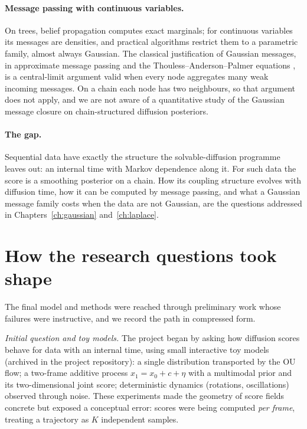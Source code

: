 \paragraph{Message passing with continuous variables.} On trees, belief
propagation computes exact marginals; for continuous variables its
messages are densities, and practical algorithms restrict them to a
parametric family, almost always Gaussian. The classical justification of
Gaussian messages, in approximate message passing and the
Thouless--Anderson--Palmer equations \citep{thouless1977solution,
donoho2009message, zdeborova2016statistical, genovese2026amp}, is a
central-limit argument valid when every node aggregates many weak
incoming messages. On a chain each node has two neighbours, so that
argument does not apply, and we are not aware of a quantitative study of
the Gaussian message closure on chain-structured diffusion posteriors.

\paragraph{The gap.} Sequential data have exactly the structure the
solvable-diffusion programme leaves out: an internal time with Markov
dependence along it. For such data the score is a smoothing posterior on a
chain. How its coupling structure evolves with diffusion time, how it can
be computed by message passing, and what a Gaussian message family costs
when the data are not Gaussian, are the questions addressed in
Chapters~\ref{ch:gaussian} and~\ref{ch:laplace}.

\section{How the research questions took shape}\label{sec:development}

The final model and methods were reached through preliminary work whose
failures were instructive, and we record the path in compressed form.

\emph{Initial question and toy models.} The project began by asking how
diffusion scores behave for data with an internal time, using small
interactive toy models (archived in the project repository): a single
distribution transported by the OU flow; a two-frame additive process
$x_1 = x_0 + c + \eta$ with a multimodal prior and its two-dimensional
joint score; deterministic dynamics (rotations, oscillations) observed
through noise. These experiments made the geometry of score fields
concrete but exposed a conceptual error: scores were being computed
\emph{per frame}, treating a trajectory as $K$ independent samples.

